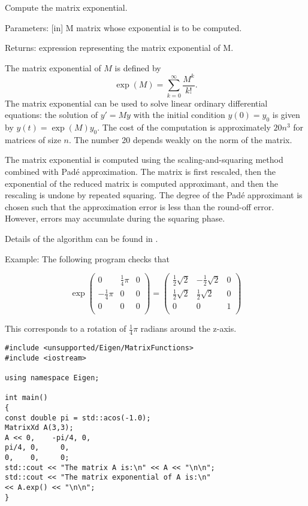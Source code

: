 \vspace{0.3cm}
Compute the matrix exponential.

Parameters: [in] M matrix whose exponential is to be computed.  

Returns: expression representing the matrix exponential of M.

The matrix exponential of $M$ is defined by 
\begin{equation}
\exp(M) = \sum_{k=0}^\infty \frac{M^k}{k!}.
\end{equation} 
The matrix exponential can be used to solve linear ordinary differential equations: the solution of $y'=M y$ with the initial condition $y(0)=y_0$ is given by $y(t)=\exp(M) y_0$.
The cost of the computation is approximately $20n^3$ for matrices of size $n$. The number 20 depends weakly on the norm of the matrix.

The matrix exponential is computed using the scaling-and-squaring method combined with Pad\'e approximation. The matrix is first rescaled, then the exponential of the reduced matrix is computed approximant, and then the rescaling is undone by repeated squaring. The degree of the Pad\'e approximant is chosen such that the approximation error is less than the round-off error. However, errors may accumulate during the squaring phase.

Details of the algorithm can be found in \cite{Higham_2005}.

Example: The following program checks that 


\begin{equation} 
\exp
\begin{pmatrix}
0 & \tfrac{1}{4}\pi & 0 \\
-\tfrac{1}{4}\pi  & 0 & 0 \\
0 & 0 & 0 \\
\end{pmatrix}
=
\begin{pmatrix}
\tfrac{1}{2}\sqrt{2} & -\tfrac{1}{2}\sqrt{2} & 0 \\
\tfrac{1}{2}\sqrt{2} & \tfrac{1}{2}\sqrt{2} & 0 \\
0 & 0 & 1 \\
\end{pmatrix}
\end{equation} 


This corresponds to a rotation of $\tfrac{1}{4}\pi$ radians around the z-axis.

\begin{lstlisting}
#include <unsupported/Eigen/MatrixFunctions>
#include <iostream>

using namespace Eigen;

int main()
{
const double pi = std::acos(-1.0);
MatrixXd A(3,3);
A << 0,    -pi/4, 0,
pi/4, 0,     0,
0,    0,     0;  
std::cout << "The matrix A is:\n" << A << "\n\n";  
std::cout << "The matrix exponential of A is:\n" 
<< A.exp() << "\n\n";
}
\end{lstlisting}

